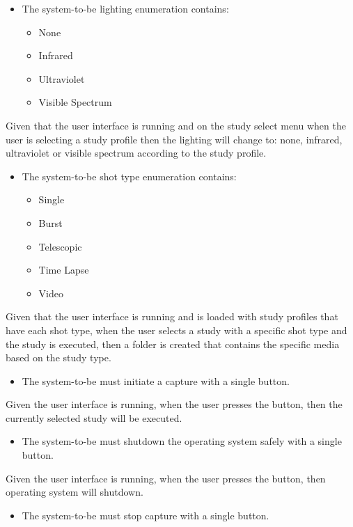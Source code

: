 \begin{itemize}
	\item The system-to-be lighting enumeration contains:
	      \begin{itemize}
		      \item None
		      \item Infrared
		      \item Ultraviolet
		      \item Visible Spectrum
	      \end{itemize}
\end{itemize}
Given that the user interface is running and on the study select menu when the user is selecting a study profile then the lighting will change to: none, infrared, ultraviolet or visible spectrum according to the study profile.
\begin{itemize}
	\item The system-to-be shot type enumeration contains:
	      \begin{itemize}
		      \item Single
		      \item Burst
		      \item Telescopic
		      \item Time Lapse
		      \item Video
	      \end{itemize}
\end{itemize}
Given that the user interface is running and is loaded with study profiles that have each shot type, when the user selects a study with a specific shot type and the study is executed, then a folder is created that contains the specific media based on the study type.
\begin{itemize}
	\item The system-to-be must initiate a capture with a single button.
\end{itemize}
Given the user interface is running, when the user presses the button, then the currently selected study will be executed.
\begin{itemize}
	\item The system-to-be must shutdown the operating system safely with a single button.
\end{itemize}
Given the user interface is running, when the user presses the button, then operating system will shutdown.
\begin{itemize}
	\item The system-to-be must stop capture with a single button.
\end{itemize}
